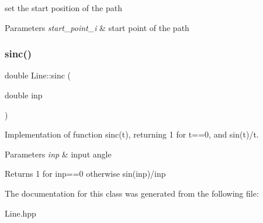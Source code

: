 set the start position of the path 


\begin{DoxyParams}{Parameters}
{\em start\+\_\+point\+\_\+i} & start point of the path \\
\hline
\end{DoxyParams}
\mbox{\label{class_line_a4976ad80d3fe4a789bac7a1916543edd}} 
\subsubsection{\texorpdfstring{sinc()}{sinc()}}
{\footnotesize\ttfamily double Line\+::sinc (\begin{DoxyParamCaption}\item[{double}]{inp }\end{DoxyParamCaption})}



Implementation of function sinc(t), returning 1 for t==0, and sin(t)/t. 


\begin{DoxyParams}{Parameters}
{\em inp} & input angle \\
\hline
\end{DoxyParams}
\begin{DoxyReturn}{Returns}
1 for inp==0 otherwise sin(inp)/inp 
\end{DoxyReturn}


The documentation for this class was generated from the following file\+:\begin{DoxyCompactItemize}
\item 
Line.\+hpp\end{DoxyCompactItemize}
